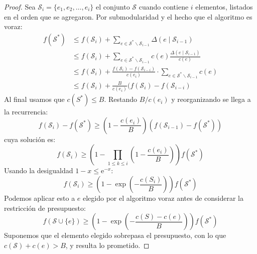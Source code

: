   \begin{proof}
    Sea \(\mathscr{S}_i = \{e_1, e_2, \dotsc, e_i\}\)
    el conjunto \(\mathscr{S}\) cuando contiene \(i\) elementos,
    listados en el orden que se agregaron.
    Por submodularidad y el hecho que el algoritmo es voraz:
    \begin{align*}
     f(\mathscr{S}^*)
       &\le f(\mathscr{S}_i)
               + \sum_{e \in \mathscr{S}^* \smallsetminus \mathscr{S}_{i - 1}}
                   \Delta(e \mid \mathscr{S}_{i - 1}) \\
       &\le f(\mathscr{S}_i)
               + \sum_{e \in \mathscr{S}^* \smallsetminus \mathscr{S}_{i - 1}}
                   c(e) \frac{\Delta(e \mid \mathscr{S}_{i - 1})}{c(e)} \\
       &\le f(\mathscr{S}_i)
               + \frac{f(\mathscr{S}_i) - f(\mathscr{S}_{i - i})}{c(e_i)}
                   \cdot \sum_{e \in \mathscr{S}^*
                               \smallsetminus \mathscr{S}_{i - 1}} c(e) \\
       &\le f(\mathscr{S}_i)
               + \frac{B}{c(e_i)} (f(\mathscr{S}_i) - f(\mathscr{S}_{i - i})
    \end{align*}
    Al final usamos que \(c(S^*) \le B\).
    Restando \(B/c(e_i)\) y reorganizando se llega a la recurrencia:
    \begin{equation*}
      f(\mathscr{S}_i) - f(\mathscr{S}^*)
        \ge \left(1 - \frac{c(e_i)}{B}\right)
             (f(\mathscr{S}_{i - 1}) - f(\mathscr{S}^*))
    \end{equation*}
    cuya solución es:
    \begin{equation*}
      f(\mathscr{S}_i)
        \ge \left(
               1 - \prod_{1 \le k \le i}
                      \left(
                         1 - \frac{c(e_i)}{B}
                      \right)
             \right) f(\mathscr{S}^*)
    \end{equation*}
    Usando la desigualdad \(1 - x \le \mathrm{e}^{-x}\):
    \begin{equation*}
      f(\mathscr{S}_i)
        \ge \left(
               1 - \exp\left(
                         - \frac{c(S_i)}{B}
                       \right)
             \right) f(\mathscr{S}^*)
    \end{equation*}
    Podemos aplicar esto a \(e\) elegido por el algoritmo voraz
    antes de considerar la restricción de presupuesto:
    \begin{equation*}
      f(\mathscr{S} \cup \{e\})
        \ge \left(
               1 - \exp\left(
                         - \frac{c(S) - c(e)}{B}
                       \right)
             \right) f(\mathscr{S}^*)
    \end{equation*}
    Suponemos que el elemento elegido sobrepasa el presupuesto,
    con lo que \(c(\mathscr{S}) + c(e) > B\),
    y resulta lo prometido.
  \end{proof}
